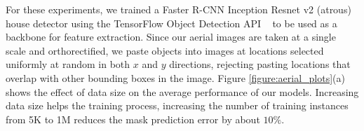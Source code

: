 \documentclass[runningheads]{llncs}
\begin{document}
For these experiments, we trained a Faster R-CNN Inception Resnet v2
(atrous) house detector using the TensorFlow Object Detection API
~\cite{huang2016speed} 
to be used as a backbone for feature extraction.
Since our aerial images are taken at a single scale and
orthorectified, we paste objects into images at locations selected uniformly at random in 
both $x$ and $y$ directions, rejecting pasting locations that 
overlap with other bounding boxes in the image.
Figure \ref{figure:aerial_plots}(a) shows the effect of data size on the average performance of our models. 
Increasing data size helps the training process, increasing the number of training instances from 5K to 1M reduces the mask prediction error by about $10\%$. 
\end{document}
